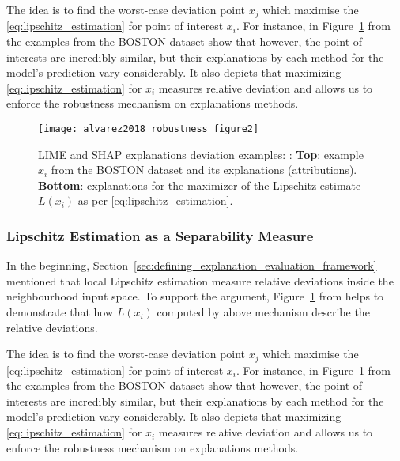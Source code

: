 \documentclass[english]{tktltiki2}
\theoremstyle{definition}
\theoremstyle{remark}
\begin{document}
The idea is to find the worst-case deviation point $x_j$ which maximise the \eqref{eq:lipschitz_estimation} for point of interest $x_i$. For instance, in Figure~\ref{fig:alvarez2018_robustness_figure2} from \citep{alvarez2018robustness} the examples from the BOSTON dataset show that however, the point of interests are incredibly similar, but their explanations by each method for the model’s prediction vary considerably. It also depicts that maximizing \eqref{eq:lipschitz_estimation} for $x_i$ measures relative deviation and allows us to enforce the robustness mechanism on explanations methods.
\begin{figure}[H]
	\texttt{[image: alvarez2018\_robustness\_figure2]}
	\vspace*{-10mm}
	\caption{LIME and SHAP explanations deviation examples: \citep{alvarez2018robustness}: \textbf{Top}: example $x_i$ from the BOSTON dataset and its explanations (attributions). \textbf{Bottom}: explanations for the maximizer of the Lipschitz estimate $L(x_i)$ as per \eqref{eq:lipschitz_estimation}.}
	\label{fig:alvarez2018_robustness_figure2}
\end{figure}


\subsubsection{Lipschitz Estimation as a Separability Measure}\label{sec:lipschitz_estimation_as_a_separability_measure} %
In the beginning, Section~\ref{sec:defining_explanation_evaluation_framework} mentioned that local Lipschitz estimation measure relative deviations inside the neighbourhood input space. To support the argument, Figure~\ref{fig:alvarez2018_robustness_figure2} from \citep{alvarez2018robustness} helps to demonstrate that how $L(x_i)$ computed by above mechanism describe the relative deviations.

The idea is to find the worst-case deviation point $x_j$ which maximise the \eqref{eq:lipschitz_estimation} for point of interest $x_i$. For instance, in Figure~\ref{fig:alvarez2018_robustness_figure2} from \citep{alvarez2018robustness} the examples from the BOSTON dataset show that however, the point of interests are incredibly similar, but their explanations by each method for the model’s prediction vary considerably. It also depicts that maximizing \eqref{eq:lipschitz_estimation} for $x_i$ measures relative deviation and allows us to enforce the robustness mechanism on explanations methods.
\end{document}
